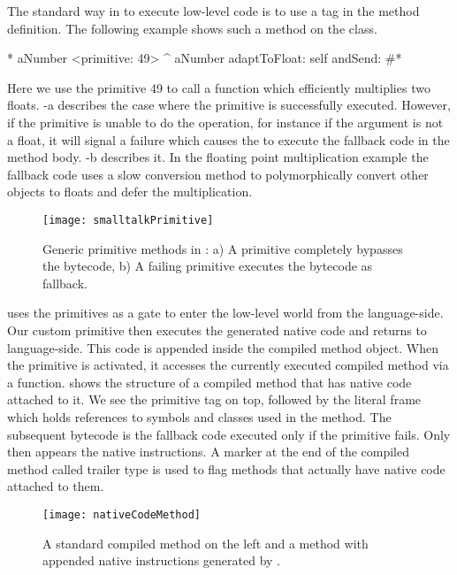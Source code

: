 The standard way in \PH to execute low-level code is to use a tag in the method definition. The following example shows such a method on the  class.
%
\begin{stcode}[label={lst:benzo-basic-primitive}]{5}
* aNumber 
	<primitive: 49>
	^ aNumber adaptToFloat: self andSend: #*
\end{stcode}
%
Here we use the primitive 49 to call a \VM function which efficiently multiplies two floats. 
-a describes the case where the primitive is successfully executed.
However, if the primitive is unable to do the operation, for instance if the argument  is not a float, it will signal a failure which causes the \VM to execute the fallback \PH code in the method body.  
-b describes it. 
In the floating point multiplication example the fallback code uses a slow conversion method to polymorphically convert other objects to floats and defer the multiplication.


\begin{figure}[ht]
	\centering
	\texttt{[image: smalltalkPrimitive]}
	\caption[\PH Primitive]{Generic primitive methods in \PH: a) A primitive completely bypasses the bytecode, b) A failing primitive executes the bytecode as fallback.}
\end{figure}

\noindent \B uses the primitives as a gate to enter the low-level world from the language-side.
Our custom primitive then executes the generated native code and returns to language-side. 
This code is appended inside the compiled method object.
When the primitive is activated, it  accesses the currently executed compiled method via a \VM function. 
 shows the structure of a \PH compiled method that has native code attached to it.
We see the primitive tag on top, followed by the literal frame which holds references to symbols and classes used in the method.
The subsequent \PH bytecode is the fallback code executed only if the primitive fails. Only then appears the native instructions.
A marker at the end of the compiled method called trailer type is used to flag methods that actually have native code attached to them.
%
\begin{figure}[ht]
	\centering
	\texttt{[image: nativeCodeMethod]}
	\caption[\PH Compiled Method]{A standard \PH compiled method on the left and a method with appended native instructions generated by \B.}
\end{figure}

